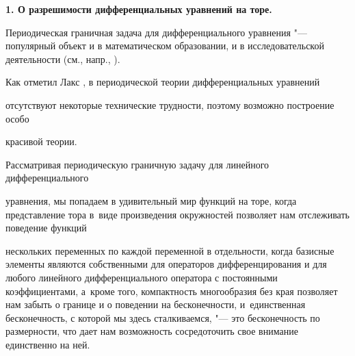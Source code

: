 \date{}








\renewcommand{\JournalDataOnline}{\displaydate{burske}}




\makerutitle







\newpage



{\bf 1. О разрешимости дифференциальных уравнений на торе.}

Периодическая граничная задача для дифференциального уравнения "--- популярный объект и в математическом образовании, и в исследовательской деятельности (см., напр., \cite{bur:1, bur:2, bur:3}). 

Как отметил Лакс \cite{bur:4}, в периодической теории дифференциальных уравнений

отсутствуют некоторые технические трудности, поэтому возможно построение особо

красивой теории.



Рассматривая периодическую граничную задачу для линейного дифференциального

уравнения, мы попадаем в удивительный мир функций на торе, когда представление тора в~виде произведения окружностей позволяет нам отслеживать поведение функций

нескольких переменных по каждой переменной в отдельности, когда базисные элементы являются собственными для операторов дифференцирования и для любого линейного дифференциального оператора с постоянными коэффициентами, а~кроме того, компактность многообразия без края позволяет нам забыть о границе и о поведении на бесконечности, и~единственная бесконечность, с которой мы здесь сталкиваемся, "--- это бесконечность по размерности, что дает нам возможность сосредоточить свое внимание единственно на ней.



\smallskip



